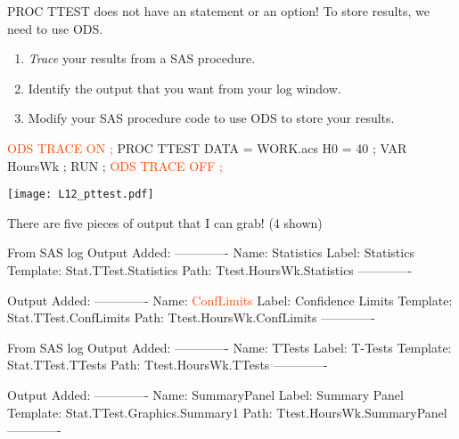 \begin{frame}
PROC TTEST does not have an  statement or an  option!  To store results, we need to use ODS.
\begin{enumerate}
\item \emph{Trace} your results from a SAS procedure.
\item Identify the output that you want from your log window.
\item Modify your SAS procedure code to use ODS to store your results.
\end{enumerate}
\end{frame}

\begin{frame}[fragile]
\hspace*{-0.3in}
\footnotesize
\begin{code}{.0}
\textcolor{OrangeRed}{ODS TRACE ON ;}
PROC TTEST DATA = WORK.acs H0 = 40 ;
   VAR HoursWk ;
RUN ;
\textcolor{OrangeRed}{ODS TRACE OFF ;}
\end{code}
\emp
{} \hspace{1in} \emp
{}
\texttt{[image: L12\_pttest.pdf]}
\emp
\end{frame}

\begin{frame}[fragile]
There are five pieces of output that I can grab! (4 shown)
\hspace*{-0.3in}
\begin{tinycraw}{.0}{From SAS log}
Output Added:
-------------
Name:       Statistics
Label:      Statistics
Template:   Stat.TTest.Statistics
Path:       Ttest.HoursWk.Statistics
-------------

Output Added:
-------------
Name:       \textcolor{OrangeRed}{ConfLimits}
Label:      Confidence Limits
Template:   Stat.TTest.ConfLimits
Path:       Ttest.HoursWk.ConfLimits
-------------
\end{tinycraw}
\emp
{} \hspace{1in} \emp
{}
\footnotesize
\begin{tinycraw}{.0}{From SAS log}
Output Added:
-------------
Name:       TTests
Label:      T-Tests
Template:   Stat.TTest.TTests
Path:       Ttest.HoursWk.TTests
-------------

Output Added:
-------------
Name:       SummaryPanel
Label:      Summary Panel
Template:   Stat.TTest.Graphics.Summary1
Path:       Ttest.HoursWk.SummaryPanel
-------------
\end{tinycraw}
\emp
\end{frame}


